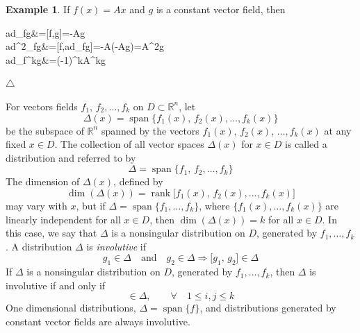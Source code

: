 \documentclass[11pt,a4paper,oneside]{book}
\numberwithin{equation}{section}
\DeclareMathOperator{\rank}{rank}
\DeclareMathOperator{\spn}{span}
\theoremstyle{it}
\theoremstyle{definition}
\newtheorem{example}{Example}[section]
\begin{document}
\begin{example}
	If $f(x)=Ax$ and $g$ is a constant vector field, then 
	\begin{flalign*}
	ad_fg&=[f,g]=-Ag	\\[6pt]
	ad^2_fg&=[f,ad_fg]=-A(-Ag)=A^2g \\[6pt]
	ad_f^kg&=(-1)^kA^kg
	\end{flalign*} 
	
	\hfill$\triangle$
\end{example}

For vectors fields $f_1,\,f_2,\dots,f_k$ on $D\subset\mathbb{R}^n$, let
\begin{equation*}
	\Delta(x)=\spn\{f_1(x),\,f_2(x), \dots,f_k(x)\}
\end{equation*}
be the subspace of $\mathbb{R}^n$ spanned by the vectors 
$f_1(x),\,f_2(x),\,\dots,f_k(x)$ at any fixed $x\in D$. The collection of 
all 
vector spaces $\Delta(x)$ for $x\in D$ is called a distribution and referred 
to 
by
\begin{equation*}
	\Delta = \spn\{f_1,\,f_2,\dots,f_k\}
\end{equation*}
The dimension of $\Delta(x)$, defined by
\begin{equation*}
	\dim(\Delta(x))=\rank\Big[f_1(x),\,f_2(x),\dots,f_k(x)\Big]
\end{equation*}
may vary with $x$, but if $\Delta=\spn\{f_1,\dots,f_k\}$, where 
$\{f_1(x),\dots,f_k(x)\}$ are linearly independent for all $x\in D$, then 
$\dim(\Delta(x))=k$ for all $x\in D$. In this case, we say that $\Delta$ is 
a 
nonsingular distribution on $D$, generated by $f_1,\dots,f_k$. A 
distribution $\Delta$ is \textit{involutive} if
\begin{equation*}
	g_1\in\Delta\quad\text{and}\quad g_2\in\Delta\Rightarrow\big[g_1,\,g_2\big]\in\Delta
\end{equation*}
If $\Delta$ is a nonsingular distribution on $D$, generated by $f_1,\dots,f_k$, then $\Delta$ is involutive if and only if
\begin{equation*}
	[f_i,\,f_j]\in \Delta,\qquad\forall\quad 1\le i,j\le k
\end{equation*}
One dimensional distributions, $\Delta=\spn\{f\}$, and distributions generated by constant vector fields are always involutive.
\end{document}
